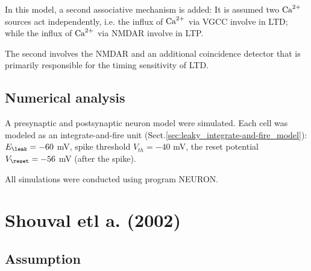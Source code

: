 In this model, a second associative mechanism is added:
It is assumed two ${\text{Ca}^{2+}}$ sources act independently, i.e. the influx
of ${\text{Ca}^{2+}}$ via VGCC involve in LTD; while the influx
of ${\text{Ca}^{2+}}$ via NMDAR involve in LTP.
 
 
 The second involves the NMDAR and an additional coincidence
detector that is primarily responsible for the timing sensitivity
of LTD.

\subsection{Numerical analysis}

A presynaptic and postsynaptic neuron model were simulated.
Each cell was modeled as an integrate-and-fire unit
(Sect.\ref{sec:leaky_integrate-and-fire_model}):
$E_\leak = -60$ mV, spike threshold $V_{th} = -40$ mV, the reset potential
$V_\reset = -56$ mV (after the spike). 

All simulations were conducted using program NEURON.

\section{Shouval etl a. (2002)}
\label{sec:Shouval-2002}

\subsection{Assumption}

